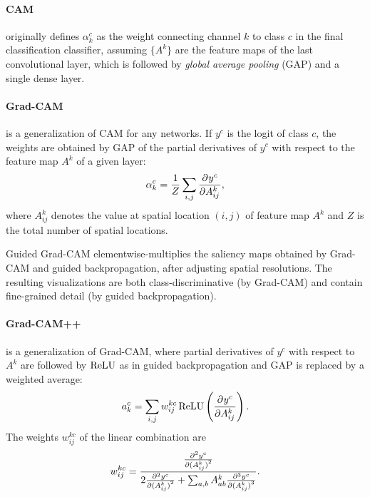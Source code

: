 \paragraph{CAM \cite{cam}}
originally defines $\alpha^c_k$ as the weight connecting channel $k$ to class $c$ in the final classification classifier, assuming $\{A^k\}$ are the feature maps of the last convolutional layer, which is followed by \emph{global average pooling} (GAP) and a single dense layer.

\paragraph{Grad-CAM \cite{gradcam}}

is a generalization of CAM for any networks. If $y^c$ is the logit of class $c$, the weights are obtained by GAP of the partial derivatives of $y^c$ with respect to the feature map $A^k$ of a given layer:
\begin{equation}
    \alpha^c_k = \frac{1}{Z} \sum_{i,j} \pder{y^c}{A^k_{ij}},
\label{eq:gcam}
\end{equation}
where $A^k_{ij}$ denotes the value at spatial location $(i,j)$ of feature map $A^k$ and $Z$ is the total number of spatial locations.

Guided Grad-CAM elementwise-multiplies the saliency maps obtained by Grad-CAM and guided backpropagation, after adjusting spatial resolutions. The resulting visualizations are both class-discriminative (by Grad-CAM) and contain fine-grained detail (by guided backpropagation).

\paragraph{Grad-CAM++ \cite{gradcampp}}

is a generalization of Grad-CAM, where partial derivatives of $y^c$ with respect to $A^k$ are followed by $\operatorname{ReLU}$ as in guided backpropagation \cite{guidedbackprop} and GAP is replaced by a weighted average:
\begin{equation}
    a^c_k = \sum_{i,j} w^{kc}_{ij} \relu \left( \pder{y^c}{A^k_{ij}} \right).
\label{eq:gcamp}
\end{equation}
The weights $w_{ij}^{kc}$ of the linear combination are
\begin{equation}
    w_{ij}^{kc} = \frac{\pder[2]{y^c}{(A^k_{ij})}}
		{2\pder[2]{y^c}{(A^k_{ij})} + \sum_{a,b} A^k_{ab}\pder[3]{y^c}{(A^k_{ij})}}.
\label{eq:gcampw}
\end{equation}

